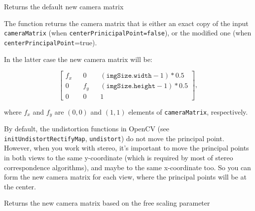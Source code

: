 \fi

\ifCpp
{}
Returns the default new camera matrix

\begin{description}
\end{description}

The function returns the camera matrix that is either an exact copy of the input \texttt{cameraMatrix} (when \texttt{centerPrinicipalPoint=false}), or the modified one (when \texttt{centerPrincipalPoint}=true).

In the latter case the new camera matrix will be:

\[\begin{bmatrix}
f_x && 0 && (\texttt{imgSize.width}-1)*0.5 \\
0 && f_y && (\texttt{imgSize.height}-1)*0.5 \\
0 && 0 && 1
\end{bmatrix},\]

where $f_x$ and $f_y$ are $(0,0)$ and $(1,1)$ elements of \texttt{cameraMatrix}, respectively.

By default, the undistortion functions in OpenCV (see \texttt{initUndistortRectifyMap}, \texttt{undistort}) do not move the principal point. However, when you work with stereo, it's important to move the principal points in both views to the same y-coordinate (which is required by most of stereo correspondence algorithms), and maybe to the same x-coordinate too. So you can form the new camera matrix for each view, where the principal points will be at the center.

\fi

\ifCPy
{}
\else
{}
\fi
Returns the new camera matrix based on the free scaling parameter

